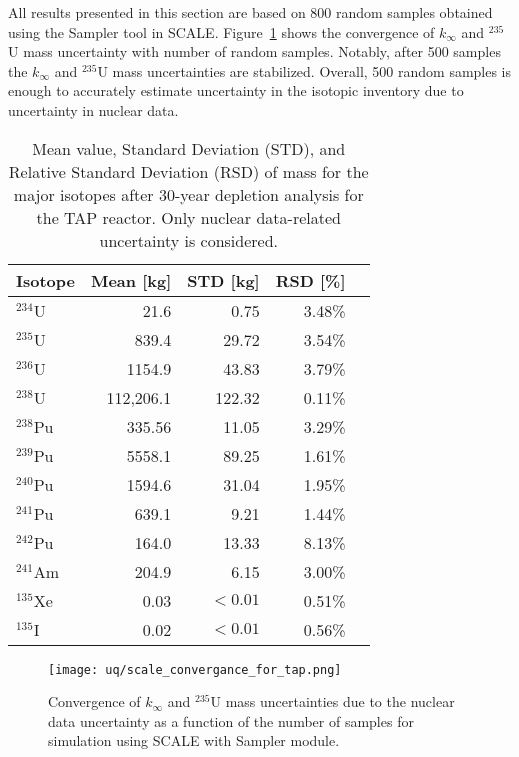 All results presented in this section are based on 800 random samples obtained 
using the Sampler tool in SCALE. Figure~\ref{fig:uq-scale-convergence} 
shows the convergence of $k_{\infty}$ and $^{235}$U mass uncertainty with 
number of random samples. Notably, after 500 samples the $k_{\infty}$ and 
$^{235}$U mass uncertainties are stabilized. Overall, 500 random samples is 
enough to accurately estimate uncertainty in the isotopic inventory due to 
uncertainty in nuclear data. 

\begin{table}[hbp!]
	\centering
	\caption{Mean value, Standard Deviation (STD), and Relative Standard 
		Deviation (RSD) of mass for the major isotopes after 30-year depletion 
		analysis for the \gls{TAP} reactor. Only nuclear data-related 
		uncertainty is considered.}
	\begin{tabularx}{0.7\textwidth}{L R R R R}
		\hline
		\textbf{Isotope}  & \textbf{Mean [kg]} & \textbf{STD [kg]} & 
		\textbf{RSD [\%]}\\ \hline
		$^{234}$U  & 21.6  & 0.75  & 3.48\% \\
		$^{235}$U  & 839.4 & 29.72 & 3.54\% \\
		$^{236}$U  & 1154.9& 43.83 & 3.79\% \\
		$^{238}$U  & 112,206.1 & 122.32 & 0.11\% \\
		$^{238}$Pu & 335.56& 11.05 & 3.29\% \\
		$^{239}$Pu & 5558.1& 89.25 & 1.61\% \\
		$^{240}$Pu & 1594.6& 31.04 & 1.95\% \\
		$^{241}$Pu & 639.1 & 9.21  & 1.44\% \\
		$^{242}$Pu & 164.0 & 13.33 & 8.13\% \\
		$^{241}$Am & 204.9 & 6.15  & 3.00\% \\
		$^{135}$Xe & 0.03  &$<0.01$& 0.51\% \\
		$^{135}$I  & 0.02  &$<0.01$& 0.56\% \\ \hline
	\end{tabularx}
	\label{tab:uq-scale-mean-std-rsd}
	\vspace{-0.9em}
\end{table}


\begin{figure}[hbp!] %
	\centering
	\texttt{[image: uq/scale\_convergance\_for\_tap.png]}
	\caption{Convergence of $k_{\infty}$ and $^{235}$U mass uncertainties due 
	to the nuclear data uncertainty as a function of the number of samples for 
	simulation using SCALE with Sampler module.}
	\label{fig:uq-scale-convergence}
\end{figure}

